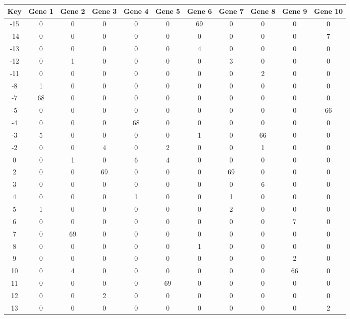\begin{tabular}{|c|c|c|c|c|c|c|c|c|c|c|}
\hline
Key & Gene 1 & Gene 2 & Gene 3 & Gene 4 & Gene 5 & Gene 6 & Gene 7 & Gene 8 & Gene 9 & Gene 10 \\
\hline
-15 & 0 & 0 & 0 & 0 & 0 & 69 & 0 & 0 & 0 & 0 \\
-14 & 0 & 0 & 0 & 0 & 0 & 0 & 0 & 0 & 0 & 7 \\
-13 & 0 & 0 & 0 & 0 & 0 & 4 & 0 & 0 & 0 & 0 \\
-12 & 0 & 1 & 0 & 0 & 0 & 0 & 3 & 0 & 0 & 0 \\
-11 & 0 & 0 & 0 & 0 & 0 & 0 & 0 & 2 & 0 & 0 \\
-8 & 1 & 0 & 0 & 0 & 0 & 0 & 0 & 0 & 0 & 0 \\
-7 & 68 & 0 & 0 & 0 & 0 & 0 & 0 & 0 & 0 & 0 \\
-5 & 0 & 0 & 0 & 0 & 0 & 0 & 0 & 0 & 0 & 66 \\
-4 & 0 & 0 & 0 & 68 & 0 & 0 & 0 & 0 & 0 & 0 \\
-3 & 5 & 0 & 0 & 0 & 0 & 1 & 0 & 66 & 0 & 0 \\
-2 & 0 & 0 & 4 & 0 & 2 & 0 & 0 & 1 & 0 & 0 \\
0 & 0 & 1 & 0 & 6 & 4 & 0 & 0 & 0 & 0 & 0 \\
2 & 0 & 0 & 69 & 0 & 0 & 0 & 69 & 0 & 0 & 0 \\
3 & 0 & 0 & 0 & 0 & 0 & 0 & 0 & 6 & 0 & 0 \\
4 & 0 & 0 & 0 & 1 & 0 & 0 & 1 & 0 & 0 & 0 \\
5 & 1 & 0 & 0 & 0 & 0 & 0 & 2 & 0 & 0 & 0 \\
6 & 0 & 0 & 0 & 0 & 0 & 0 & 0 & 0 & 7 & 0 \\
7 & 0 & 69 & 0 & 0 & 0 & 0 & 0 & 0 & 0 & 0 \\
8 & 0 & 0 & 0 & 0 & 0 & 1 & 0 & 0 & 0 & 0 \\
9 & 0 & 0 & 0 & 0 & 0 & 0 & 0 & 0 & 2 & 0 \\
10 & 0 & 4 & 0 & 0 & 0 & 0 & 0 & 0 & 66 & 0 \\
11 & 0 & 0 & 0 & 0 & 69 & 0 & 0 & 0 & 0 & 0 \\
12 & 0 & 0 & 2 & 0 & 0 & 0 & 0 & 0 & 0 & 0 \\
13 & 0 & 0 & 0 & 0 & 0 & 0 & 0 & 0 & 0 & 2 \\
\hline
\end{tabular}